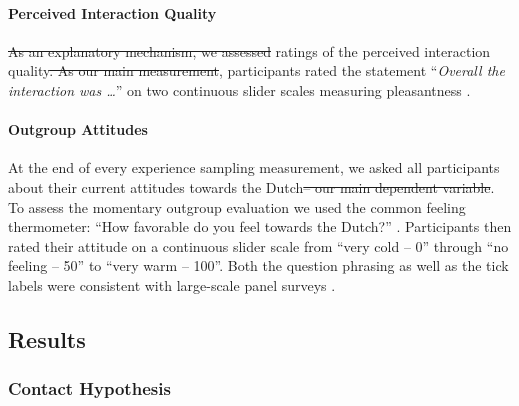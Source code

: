 \documentclass[man, 12pt, a4paper, mask]{apa7}
\theoremstyle{break}
\theoremstyle{plain}
\providecommand{\DIFaddtex}[1]{{\protect\color{blue}\uwave{#1}}} %
\providecommand{\DIFdeltex}[1]{{\protect\color{red}\sout{#1}}}                      %
\providecommand{\DIFaddbegin}{} %
\providecommand{\DIFaddend}{} %
\providecommand{\DIFdelbegin}{} %
\providecommand{\DIFdelend}{} %
\providecommand{\DIFadd}[1]{\texorpdfstring{\DIFaddtex{#1}}{#1}} %
\providecommand{\DIFdel}[1]{\texorpdfstring{\DIFdeltex{#1}}{}} %
\newcommand{\DIFscaledelfig}{0.5}
\newlength{\DIFdelgraphicswidth} %
\newlength{\DIFdelgraphicsheight} %
\newcommand{\DIFaddincludegraphics}[2][]{{\color{blue}\fbox{\DIFOincludegraphics[#1]{#2}}}} %
\newcommand{\DIFdelincludegraphics}[2][]{%
\sbox{\DIFdelgraphicsbox}{\DIFOincludegraphics[#1]{#2}}%
\settoboxwidth{\DIFdelgraphicswidth}{\DIFdelgraphicsbox} %
\settoboxtotalheight{\DIFdelgraphicsheight}{\DIFdelgraphicsbox} %
\scalebox{\DIFscaledelfig}{%
\parbox[b]{\DIFdelgraphicswidth}{\usebox{\DIFdelgraphicsbox}\\[-\baselineskip] \rule{\DIFdelgraphicswidth}{0em}}\llap{\resizebox{\DIFdelgraphicswidth}{\DIFdelgraphicsheight}{%
\setlength{\unitlength}{\DIFdelgraphicswidth}%
\begin{picture}(1,1)%
\thicklines\linethickness{2pt} %
{\color[rgb]{1,0,0}\put(0,0){\framebox(1,1){}}}%
{\color[rgb]{1,0,0}\put(0,0){\line( 1,1){1}}}%
{\color[rgb]{1,0,0}\put(0,1){\line(1,-1){1}}}%
\end{picture}%
}\hspace*{3pt}}} %
} %
\DeclareRobustCommand{\DIFaddbegin}{\DIFOaddbegin \let\includegraphics\DIFaddincludegraphics} %
\DeclareRobustCommand{\DIFaddend}{\DIFOaddend \let\includegraphics\DIFOincludegraphics} %
\DeclareRobustCommand{\DIFdelbegin}{\DIFOdelbegin \let\includegraphics\DIFdelincludegraphics} %
\DeclareRobustCommand{\DIFdelend}{\DIFOaddend \let\includegraphics\DIFOincludegraphics} %
\begin{document}
\paragraph{Perceived Interaction Quality}

\DIFdelbegin \DIFdel{As an explanatory mechanism, we assessed }\DIFdelend \DIFaddbegin \DIFadd{To assess }\DIFaddend ratings of the perceived interaction quality\DIFdelbegin \DIFdel{. As our main measurement}\DIFdelend , participants
rated the statement ``\textit{Overall the interaction was …}'' on two
continuous slider scales measuring pleasantness
\citep[from unpleasant (-50) to pleasant (+50)) and meaningfulness (from superficial (-50) to meaningful (+50); both items adapted from][]{Downie2008}.

\paragraph{Outgroup Attitudes}

At the end of every experience sampling measurement, we asked all
participants about their current attitudes towards the Dutch\DIFdelbegin \DIFdel{-- our main
dependent variable}\DIFdelend . To assess
the momentary outgroup evaluation we used the common feeling
thermometer: ``How favorable do you feel towards the Dutch?''
\citep[][]{Lavrakas2008}. Participants then rated their attitude on a
continuous slider scale from ``very cold -- 0'' through ``no feeling --
50'' to ``very warm -- 100''. Both the question phrasing as well as the
tick labels were consistent with large-scale panel surveys
\citep[e.g.,][]{DeBell2010}.

\subsection{Results}

\subsubsection{Contact Hypothesis}
\end{document}
